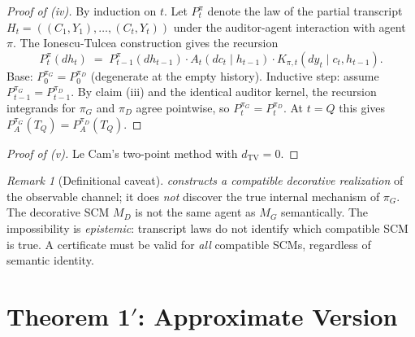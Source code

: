 \documentclass{article}
\theoremstyle{plain}
\theoremstyle{definition}
\theoremstyle{remark}
\newtheorem{remark}[theorem]{Remark}
\newcommand{\TV}{\mathrm{TV}}
\newcommand{\dtv}{d_{\TV}}
\begin{document}
\begin{proof}[Proof of (iv)]
By induction on $t$. Let $P_t^\pi$ denote the law of the partial transcript
$H_t = ((C_1, Y_1), \ldots, (C_t, Y_t))$ under the auditor-agent interaction
with agent $\pi$. The Ionescu-Tulcea construction gives the recursion
\[
P_t^\pi(d h_t) \;=\; P_{t-1}^\pi(d h_{t-1}) \cdot A_t(d c_t \mid h_{t-1}) \cdot K_{\pi, t}(d y_t \mid c_t, h_{t-1}).
\]
Base: $P_0^{\pi_G} = P_0^{\pi_D}$ (degenerate at the empty history).
Inductive step: assume $P_{t-1}^{\pi_G} = P_{t-1}^{\pi_D}$. By claim (iii)
and the identical auditor kernel, the recursion integrands for $\pi_G$ and
$\pi_D$ agree pointwise, so $P_t^{\pi_G} = P_t^{\pi_D}$. At $t = Q$ this
gives $P_A^{\pi_G}(T_Q) = P_A^{\pi_D}(T_Q)$.
\end{proof}

\begin{proof}[Proof of (v)]
Le Cam's two-point method with $\dtv = 0$.
\end{proof}

\begin{remark}[Definitional caveat]\label{rem:caveat}
 \emph{constructs a compatible decorative realization}
of the observable channel; it does \emph{not} discover the true internal mechanism
of $\pi_G$. The decorative SCM $M_D$ is not the same agent as $M_G$ semantically.
The impossibility is \emph{epistemic}: transcript laws do not identify which
compatible SCM is true. A certificate must be valid for \emph{all} compatible
SCMs, regardless of semantic identity.
\end{remark}

\section{Theorem 1$'$: Approximate Version}\label{sec:approx}
\end{document}
